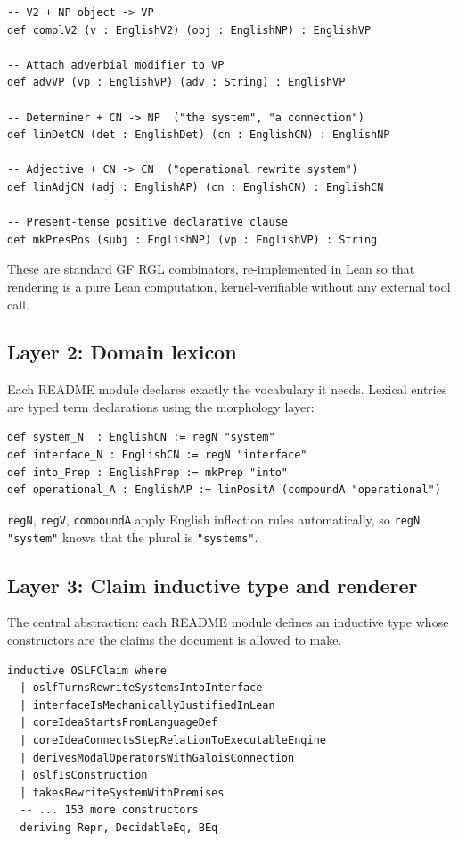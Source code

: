 \documentclass[11pt]{article}
\newcommand{\code}[1]{\texttt{#1}}
\begin{document}
\begin{lstlisting}[caption={Selected GF combinators}]
-- V2 + NP object -> VP
def complV2 (v : EnglishV2) (obj : EnglishNP) : EnglishVP

-- Attach adverbial modifier to VP
def advVP (vp : EnglishVP) (adv : String) : EnglishVP

-- Determiner + CN -> NP  ("the system", "a connection")
def linDetCN (det : EnglishDet) (cn : EnglishCN) : EnglishNP

-- Adjective + CN -> CN  ("operational rewrite system")
def linAdjCN (adj : EnglishAP) (cn : EnglishCN) : EnglishCN

-- Present-tense positive declarative clause
def mkPresPos (subj : EnglishNP) (vp : EnglishVP) : String
\end{lstlisting}

\noindent These are standard GF RGL combinators,
re-implemented in Lean so that rendering is a pure Lean computation,
kernel-verifiable without any external tool call.

\subsection{Layer 2: Domain lexicon}

Each README module declares exactly the vocabulary it needs.
Lexical entries are typed term declarations using the morphology layer:

\begin{lstlisting}[caption={Typical domain lexicon declarations}]
def system_N  : EnglishCN := regN "system"
def interface_N : EnglishCN := regN "interface"
def into_Prep : EnglishPrep := mkPrep "into"
def operational_A : EnglishAP := linPositA (compoundA "operational")
\end{lstlisting}

\noindent \code{regN}, \code{regV}, \code{compoundA} apply English inflection rules
automatically, so \code{regN "system"} knows that the plural is \code{"systems"}.

\subsection{Layer 3: Claim inductive type and renderer}

The central abstraction: each README module defines an inductive type whose
constructors are the claims the document is allowed to make.

\begin{lstlisting}[caption={OSLFClaim (abridged; 160 constructors total)}]
inductive OSLFClaim where
  | oslfTurnsRewriteSystemsIntoInterface
  | interfaceIsMechanicallyJustifiedInLean
  | coreIdeaStartsFromLanguageDef
  | coreIdeaConnectsStepRelationToExecutableEngine
  | derivesModalOperatorsWithGaloisConnection
  | oslfIsConstruction
  | takesRewriteSystemWithPremises
  -- ... 153 more constructors
  deriving Repr, DecidableEq, BEq
\end{lstlisting}
\end{document}

